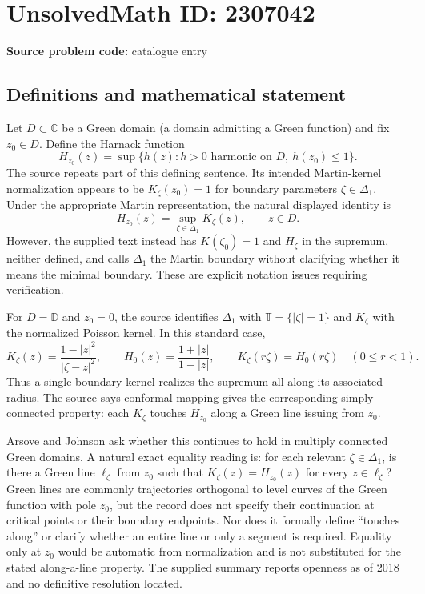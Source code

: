 \documentclass[11pt]{article}
\newcommand{\C}{\mathbb{C}}
\begin{document}
\section*{UnsolvedMath ID: 2307042}
\textbf{Source problem code:} catalogue entry
\subsection{Definitions and mathematical statement}
Let $D\subset\C$ be a Green domain (a domain admitting a Green function) and fix $z_0\in D$. Define the Harnack function
\[
H_{z_0}(z)=\sup\{h(z):h>0\text{ harmonic on }D,\ h(z_0)\leq1\}.
\]
The source repeats part of this defining sentence. Its intended Martin-kernel normalization appears to be $K_\zeta(z_0)=1$ for boundary parameters $\zeta\in\Delta_1$. Under the appropriate Martin representation, the natural displayed identity is
\[
H_{z_0}(z)=\sup_{\zeta\in\Delta_1}K_\zeta(z),\qquad z\in D.
\]
However, the supplied text instead has $K(\zeta_0)=1$ and $H_\zeta$ in the supremum, neither defined, and calls $\Delta_1$ the Martin boundary without clarifying whether it means the minimal boundary. These are explicit notation issues requiring verification.

For $D=\mathbb D$ and $z_0=0$, the source identifies $\Delta_1$ with $\mathbb T=\{|\zeta|=1\}$ and $K_\zeta$ with the normalized Poisson kernel. In this standard case,
\[
K_\zeta(z)=\frac{1-|z|^2}{|\zeta-z|^2},\qquad
H_0(z)=\frac{1+|z|}{1-|z|},\qquad
K_\zeta(r\zeta)=H_0(r\zeta)\quad(0\leq r<1).
\]
Thus a single boundary kernel realizes the supremum all along its associated radius. The source says conformal mapping gives the corresponding simply connected property: each $K_\zeta$ touches $H_{z_0}$ along a Green line issuing from $z_0$.

Arsove and Johnson ask whether this continues to hold in multiply connected Green domains. A natural exact equality reading is: for each relevant $\zeta\in\Delta_1$, is there a Green line $\ell_\zeta$ from $z_0$ such that $K_\zeta(z)=H_{z_0}(z)$ for every $z\in\ell_\zeta$? Green lines are commonly trajectories orthogonal to level curves of the Green function with pole $z_0$, but the record does not specify their continuation at critical points or their boundary endpoints. Nor does it formally define ``touches along'' or clarify whether an entire line or only a segment is required. Equality only at $z_0$ would be automatic from normalization and is not substituted for the stated along-a-line property. The supplied summary reports openness as of 2018 and no definitive resolution located.
\end{document}
